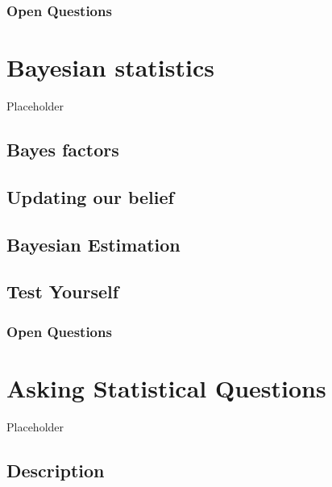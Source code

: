 \documentclass[
  oneside]{krantz}
\begin{document}
\hypertarget{open-questions-2}{%
\subsubsection{Open Questions}\label{open-questions-2}}

\hypertarget{bayes}{%
\section{Bayesian statistics}\label{bayes}}

Placeholder

\hypertarget{bayes-factors}{%
\subsection{Bayes factors}\label{bayes-factors}}

\hypertarget{updating-our-belief}{%
\subsection{Updating our belief}\label{updating-our-belief}}

\hypertarget{bayesest}{%
\subsection{Bayesian Estimation}\label{bayesest}}

\hypertarget{test-yourself-3}{%
\subsection{Test Yourself}\label{test-yourself-3}}

\hypertarget{open-questions-3}{%
\subsubsection{Open Questions}\label{open-questions-3}}

\hypertarget{questions}{%
\section{Asking Statistical Questions}\label{questions}}

Placeholder

\hypertarget{description}{%
\subsection{Description}\label{description}}
\end{document}
